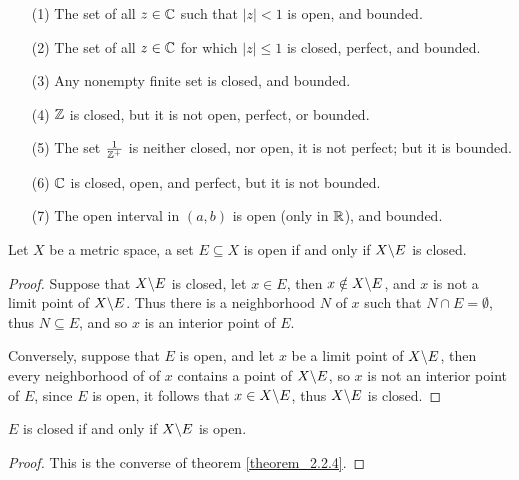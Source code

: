 \begin{example}
  \begin{enumerate}
    \item[(1)] The set of all $z \in \mathbb{C}$ such that $|z|<1$ is open, and bounded.

    \item[(2)] The set of all $z \in \mathbb{C}$ for which  $|z| \leq 1$ is closed, perfect,
      and bounded.

    \item[(3)] Any nonempty finite set is closed, and bounded.

    \item[(4)] $\mathbb{Z}$ is closed, but it is not open, perfect, or bounded.

    \item[(5)] The set  $ \frac{1}{\mathbb{Z}^+}$ is neither closed, nor open, it is not
      perfect; but it is bounded.

    \item[(6)] $\mathbb{C}$ is closed, open, and perfect, but it is not bounded.

      \itemp(7) The open interval in  $(a,b)$ is open (only in $\mathbb{R}$), and bounded.
  \end{enumerate}
\end{example}

\begin{theorem}\label{theorem_2.2.5}
  Let $X$ be a metric space, a set  $E \subseteq X$ is open if and only if
  $X \backslash E$ is closed.
\end{theorem}
\begin{proof}
  Suppose that $X \backslash E$ is closed, let  $x \in E$, then  $x \notin
  X \backslash E$, and $x$ is not a limit point of  $X \backslash E$. Thus there is a
  neighborhood $N$ of  $x$ such that $N \cap E=\emptyset$, thus $N \subseteq E$,
  and so $x$ is an interior point of  $E$.

  Conversely, suppose that  $E$ is open, and let  $x$ be a limit point of
  $X \backslash E$, then every neighborhood of of  $x$ contains a point of
  $X \backslash E$, so  $x$ is not an interior point of  $E$, since  $E$ is open,
  it follows that  $x \in X \backslash E$, thus $X \backslash E$ is closed.
\end{proof}
\begin{corollary}
  $E$ is closed if and only if  $X \backslash E$ is open.
\end{corollary}
\begin{proof}
  This is the converse of theorem \ref{theorem_2.2.4}.
\end{proof}


